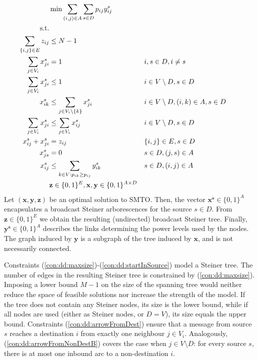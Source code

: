 \begin{subequations}
\begin{flalign}
\label{objective:dd} &\makebox[0pt][l]{$\displaystyle{}\min \sum\limits_{(i,j) \in A} \sum\limits_{s \in D} p_{ij} y^s_{ij} $}  & &&\\ \notag  
\text{s.t.}&  &  &                 && \\	\
\label{con:dd:maxsize}\sum\limits_{\{i,j\}\in E}z_{ij} & \leq  N-1 &  && \\
\label{con:dd:arrowFromDest} \sum\limits_{j\in V_i}x^s_{ji} & = 1 && i,s\in D,i\neq s && \\ 
\label{con:dd:arrowFromNonDestB} \sum\limits_{j\in V_{i}}x^s_{ji} & \leq 1 && i\in V \setminus D, s\in D   &&\\	
\label{con:dd:arrowFromNonDestA} x^s_{ik}  & \leq \sum\limits_{j\in V_{i}\setminus \{k\}}x^s_{ji} && i\in V \setminus D,(i,k)\in A, s\in D   &&\\	
\label{con:dd:extraCon} \sum\limits_{j\in V_{i}}x^s_{ji} & \leq \sum\limits_{j\in V_{i}}x^s_{ij} &&  	i\in V\setminus D, s\in D  &&\\	
\label{con:dd:oneDir} x^s_{ij} + x^s_{ji} & = z_{ij} && \{i,j\}\in E, s\in D &&\\
\label{con:dd:startInSource}  x^s_{js}    & = 0   &&  s\in D, (j,s)\in A &&\\		 
\label{con:dd:yvar} x^s_{ij} & \leq \sum\limits_{k\in V:p_{ik}\geq p_{ij}}y^s_{ik} && s\in D, (i,j)\in A &&\\  
& \label{con:dd:vardim}	\mathbf{z} \in \{0,1\}^{E}, \mathbf{x},\mathbf{y}\in \{0,1\}^{A\times D} &&	
\end{flalign}~
\end{subequations}   
Let $(\mathbf{x},\mathbf{y}, \mathbf{z})$ be an optimal solution to SMTO. Then, the vector $\mathbf{x^s}\in \{0,1\}^{A}$ encapsulates a broadcast Steiner arborescences for the source $s\in D$. From $\mathbf{z}\in \{0,1\}^E$ we obtain the resulting (undirected) broadcast Steiner tree. Finally, $\mathbf{y^s}\in \{0,1\}^{A}$ describes the links determining the power levels used by the nodes. The graph induced by $\mathbf{y}$ is  a subgraph of the tree induced by $\mathbf{x}$, and is not necessarily connected.

Constraints (\ref{con:dd:maxsize})-(\ref{con:dd:startInSource}) model a Steiner tree.  The number of edges in the resulting Steiner tree is constrained by (\ref{con:dd:maxsize}). Imposing a lower bound $M-1$ on the size of the spanning tree would neither reduce the space of feasible solutions nor increase the strength of the model. If the tree does not contain any Steiner nodes, its size is the lower bound, while if all nodes are used (either as Steiner nodes, or $D = V$), its size equals the upper bound. Constraints (\ref{con:dd:arrowFromDest}) ensure that a message from source $s$ reaches a destination $i$ from exactly one neighbour $j\in V_i$. Analogously, (\ref{con:dd:arrowFromNonDestB}) covers the case when $j \in V\setminus D$: for every source $s$, there is at most one inbound arc to a non-destination $i$. 


